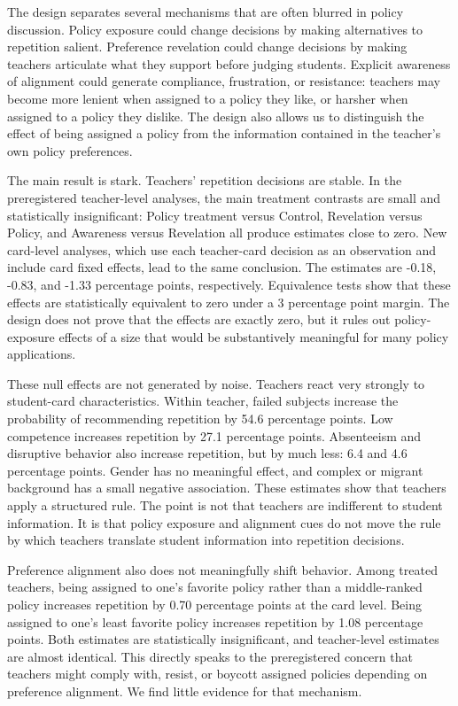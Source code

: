 \documentclass[12pt,a4paper]{article}
\begin{document}
The design separates several mechanisms that are often blurred in policy discussion. Policy exposure could change decisions by making alternatives to repetition salient. Preference revelation could change decisions by making teachers articulate what they support before judging students. Explicit awareness of alignment could generate compliance, frustration, or resistance: teachers may become more lenient when assigned to a policy they like, or harsher when assigned to a policy they dislike. The design also allows us to distinguish the effect of being assigned a policy from the information contained in the teacher's own policy preferences.

The main result is stark. Teachers' repetition decisions are stable. In the preregistered teacher-level analyses, the main treatment contrasts are small and statistically insignificant: Policy treatment versus Control, Revelation versus Policy, and Awareness versus Revelation all produce estimates close to zero. New card-level analyses, which use each teacher-card decision as an observation and include card fixed effects, lead to the same conclusion. The estimates are -0.18, -0.83, and -1.33 percentage points, respectively. Equivalence tests show that these effects are statistically equivalent to zero under a 3 percentage point margin. The design does not prove that the effects are exactly zero, but it rules out policy-exposure effects of a size that would be substantively meaningful for many policy applications.

These null effects are not generated by noise. Teachers react very strongly to student-card characteristics. Within teacher, failed subjects increase the probability of recommending repetition by 54.6 percentage points. Low competence increases repetition by 27.1 percentage points. Absenteeism and disruptive behavior also increase repetition, but by much less: 6.4 and 4.6 percentage points. Gender has no meaningful effect, and complex or migrant background has a small negative association. These estimates show that teachers apply a structured rule. The point is not that teachers are indifferent to student information. It is that policy exposure and alignment cues do not move the rule by which teachers translate student information into repetition decisions.

Preference alignment also does not meaningfully shift behavior. Among treated teachers, being assigned to one's favorite policy rather than a middle-ranked policy increases repetition by 0.70 percentage points at the card level. Being assigned to one's least favorite policy increases repetition by 1.08 percentage points. Both estimates are statistically insignificant, and teacher-level estimates are almost identical. This directly speaks to the preregistered concern that teachers might comply with, resist, or boycott assigned policies depending on preference alignment. We find little evidence for that mechanism.
\end{document}
